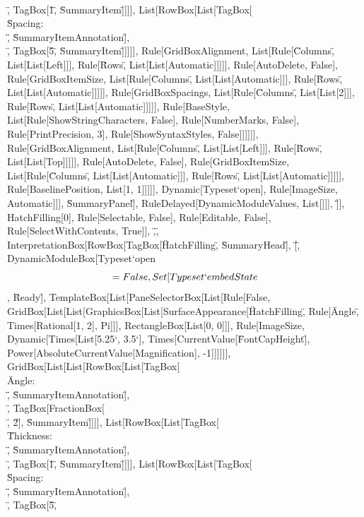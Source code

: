 \documentclass{article}
\begin{document}
{{{{\"\\[InvisibleSpace]\", TagBox[\"1\", \"SummaryItem\"]]]], List[RowBox[List[TagBox[\"\\\"Spacing: \\\"\", \"SummaryItemAnnotation\"], \"\\[InvisibleSpace]\",
TagBox[\"5\", \"SummaryItem\"]]]]], Rule[GridBoxAlignment, List[Rule[\"Columns\", List[List[Left]]], Rule[\"Rows\", List[List[Automatic]]]]], Rule[AutoDelete,
False], Rule[GridBoxItemSize, List[Rule[\"Columns\", List[List[Automatic]]], Rule[\"Rows\", List[List[Automatic]]]]], Rule[GridBoxSpacings, List[Rule[\"Columns\",
List[List[2]]], Rule[\"Rows\", List[List[Automatic]]]]], Rule[BaseStyle, List[Rule[ShowStringCharacters, False], Rule[NumberMarks, False], Rule[PrintPrecision,
3], Rule[ShowSyntaxStyles, False]]]]]], Rule[GridBoxAlignment, List[Rule[\"Columns\", List[List[Left]]], Rule[\"Rows\", List[List[Top]]]]], Rule[AutoDelete,
False], Rule[GridBoxItemSize, List[Rule[\"Columns\", List[List[Automatic]]], Rule[\"Rows\", List[List[Automatic]]]]], Rule[BaselinePosition, List[1,
1]]]]], Dynamic[Typeset`open$$], Rule[ImageSize, Automatic]]], \"SummaryPanel\"], RuleDelayed[DynamicModuleValues, List[]]], \"]\"}], HatchFilling[0],
Rule[Selectable, False], Rule[Editable, False], Rule[SelectWithContents, True]], \",\", InterpretationBox[RowBox[{TagBox[\"HatchFilling\", \"SummaryHead\"],
\"[\", DynamicModuleBox[{Typeset`open$$ = False, Set[Typeset`embedState$$, \"Ready\"]}, TemplateBox[List[PaneSelectorBox[List[Rule[False, GridBox[List[List[GraphicsBox[List[SurfaceAppearance[\"HatchFilling\",
Rule[\"Angle\", Times[Rational[1, 2], Pi]]], RectangleBox[List[0, 0]]], Rule[ImageSize, Dynamic[Times[List[5.25`, 3.5`], Times[CurrentValue[\"FontCapHeight\"],
Power[AbsoluteCurrentValue[Magnification], -1]]]]]], GridBox[List[List[RowBox[List[TagBox[\"\\\"Angle: \\\"\", \"SummaryItemAnnotation\"], \"\\[InvisibleSpace]\",
TagBox[FractionBox[\"\\[Pi]\", \"2\"], \"SummaryItem\"]]]], List[RowBox[List[TagBox[\"\\\"Thickness: \\\"\", \"SummaryItemAnnotation\"], \"\\[InvisibleSpace]\",
TagBox[\"1\", \"SummaryItem\"]]]], List[RowBox[List[TagBox[\"\\\"Spacing: \\\"\", \"SummaryItemAnnotation\"], \"\\[InvisibleSpace]\", TagBox[\"5\",
}}}}
\end{document}
